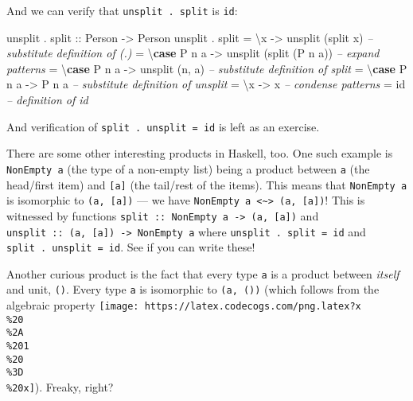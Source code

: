 \documentclass[]{article}
\newenvironment{Shaded}{}{}
\newcommand{\CommentTok}[1]{\textcolor[rgb]{0.38,0.63,0.69}{\textit{#1}}}
\newcommand{\DataTypeTok}[1]{\textcolor[rgb]{0.56,0.13,0.00}{#1}}
\newcommand{\FunctionTok}[1]{\textcolor[rgb]{0.02,0.16,0.49}{#1}}
\newcommand{\KeywordTok}[1]{\textcolor[rgb]{0.00,0.44,0.13}{\textbf{#1}}}
\newcommand{\NormalTok}[1]{#1}
\newcommand{\OtherTok}[1]{\textcolor[rgb]{0.00,0.44,0.13}{#1}}
\begin{document}
And we can verify that \texttt{unsplit\ .\ split} is \texttt{id}:

\begin{Shaded}
\begin{Highlighting}[]
\NormalTok{unsplit }\FunctionTok{.}\OtherTok{ split ::} \DataTypeTok{Person} \OtherTok{->} \DataTypeTok{Person}
\NormalTok{unsplit }\FunctionTok{.}\NormalTok{ split}
    \FunctionTok{=}\NormalTok{ \textbackslash{}x          }\OtherTok{->}\NormalTok{ unsplit (split x)        }\CommentTok{-- substitute definition of (.)}
    \FunctionTok{=}\NormalTok{ \textbackslash{}}\KeywordTok{case} \DataTypeTok{P}\NormalTok{ n a }\OtherTok{->}\NormalTok{ unsplit (split (}\DataTypeTok{P}\NormalTok{ n a))  }\CommentTok{-- expand patterns}
    \FunctionTok{=}\NormalTok{ \textbackslash{}}\KeywordTok{case} \DataTypeTok{P}\NormalTok{ n a }\OtherTok{->}\NormalTok{ unsplit (n, a)           }\CommentTok{-- substitute definition of split}
    \FunctionTok{=}\NormalTok{ \textbackslash{}}\KeywordTok{case} \DataTypeTok{P}\NormalTok{ n a }\OtherTok{->} \DataTypeTok{P}\NormalTok{ n a                    }\CommentTok{-- substitute definition of unsplit}
    \FunctionTok{=}\NormalTok{ \textbackslash{}x      }\OtherTok{->}\NormalTok{ x                            }\CommentTok{-- condense patterns}
    \FunctionTok{=} \FunctionTok{id}                                      \CommentTok{-- definition of id}
\end{Highlighting}
\end{Shaded}

And verification of \texttt{split\ .\ unsplit\ =\ id} is left as an exercise.

There are some other interesting products in Haskell, too. One such example is
\texttt{NonEmpty\ a} (the type of a non-empty list) being a product between
\texttt{a} (the head/first item) and \texttt{{[}a{]}} (the tail/rest of the
items). This means that \texttt{NonEmpty\ a} is isomorphic to
\texttt{(a,\ {[}a{]})} --- we have
\texttt{NonEmpty\ a\ \textless{}\textasciitilde{}\textgreater{}\ (a,\ {[}a{]})}!
This is witnessed by functions
\texttt{split\ ::\ NonEmpty\ a\ -\textgreater{}\ (a,\ {[}a{]})} and
\texttt{unsplit\ ::\ (a,\ {[}a{]})\ -\textgreater{}\ NonEmpty\ a} where
\texttt{unsplit\ .\ split\ =\ id} and \texttt{split\ .\ unsplit\ =\ id}. See if
you can write these!

Another curious product is the fact that every type \texttt{a} is a product
between \emph{itself} and unit, \texttt{()}. Every type \texttt{a} is isomorphic
to \texttt{(a,\ ())} (which follows from the algebraic property
\texttt{[image: https://latex.codecogs.com/png.latex?x\\\%20\\\%2A\\\%201\\\%20\\\%3D\\\%20x]}).
Freaky, right?
\end{document}
